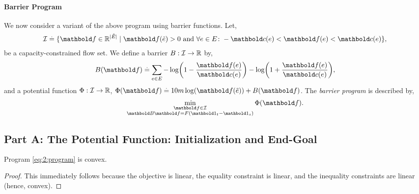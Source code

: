 \documentclass[nobib]{tufte-handout}
\newcommand{\Etil}{\Tilde{E}}
\newcommand{\etil}{\Tilde{e}}
\newcommand{\barrierflowset}{\mathcal{I}}
\begin{document}
\paragraph{Barrier Program} We now consider a variant of the above program using barrier functions. Let, \begin{align*}
    \barrierflowset \defeq \{\vf \in \R^{|\Etil|} \mid \text{$\vf(\etil) > 0$ and $\forall e \in E \colon -\vc(e) < \vf(e) < \vc(e)$}\},
\end{align*} be a capacity-constrained flow set. We define a barrier $B: \barrierflowset \to \R$ by, \begin{align*}
    B(\vf) \defeq \sum_{e \in E} - \log\parentheses*{1 - \frac{\vf(e)}{\vc(e)}} - \log\parentheses*{1 + \frac{\vf(e)}{\vc(e)}},
\end{align*} and a potential function $\Phi : \barrierflowset \to \R$, $\Phi(\vf) \defeq 10 m \log(\vf(\etil)) + B(\vf)$. The \emph{barrier program} is described by, \begin{align}
    \min_{\substack{\vf \in \barrierflowset \\ \mB\vf = F(\vOne_t - \vOne_s)}} \Phi(\vf). \label{eq:2:barrier_program}
\end{align}

\subsection{Part A: The Potential Function: Initialization and End-Goal}

\begin{lem}
Program \eqref{eq:2:program} is convex.
\end{lem}
\begin{proof}
This immediately follows because the objective is linear, the equality constraint is linear, and the inequality constraints are linear (hence, convex).
\end{proof}
\end{document}
